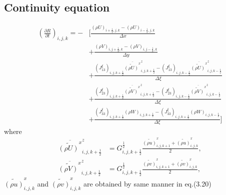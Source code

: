 \subsection{Continuity equation}
\begin{align}
 \left(\frac{\partial R}{\partial t}\right)_{i,j,k}
 = - &\Bigg[ \frac{ (\rho U)_{i+\frac{1}{2},j,k}
                  - (\rho U)_{i-\frac{1}{2},j,k}
                  } {\Delta x} \nonumber \\
          &+ \frac{ (\rho V)_{i,j+\frac{1}{2},k}
                  - (\rho V)_{i,j-\frac{1}{2},k}
                  } {\Delta y} \nonumber \\
          &+ \frac{ (J^{\xi}_{13})_{i,j,k+\frac{1}{2}} \overline{\widetilde{(\rho U)}^x}^z_{i,j,k+\frac{1}{2}}
                  - (J^{\xi}_{13})_{i,j,k-\frac{1}{2}} \overline{\widetilde{(\rho U)}^x}^z_{i,j,k-\frac{1}{2}}
                  } {\Delta \xi} \nonumber \\
          &+ \frac{ (J^{\xi}_{23})_{i,j,k+\frac{1}{2}} \overline{\widetilde{(\rho V)}^x}^z_{i,j,k+\frac{1}{2}}
                  - (J^{\xi}_{23})_{i,j,k-\frac{1}{2}} \overline{\widetilde{(\rho V)}^x}^z_{i,j,k-\frac{1}{2}}
                  } {\Delta \xi} \nonumber \\
          &+ \frac{ (J^{\xi}_{33})_{i,j,k+\frac{1}{2}} (\rho W)_{i,j,k+\frac{1}{2}}
                  - (J^{\xi}_{33})_{i,j,k+\frac{1}{2}} (\rho W)_{i,j,k-\frac{1}{2}}
                  } {\Delta \xi} \Bigg]
\end{align}
where
\begin{align}
 \overline{\widetilde{(\rho U)}^x}^z_{i,j,k+\frac{1}{2}}
 &= G^{\frac{1}{2}}_{i,j,k+\frac{1}{2}} \frac{ \widetilde{(\rho u)}^x_{i,j,k+1}
                                             + \widetilde{(\rho u)}^x_{i,j,k  }
                                             } {2}, \\
 \overline{\widetilde{(\rho V)}^x}^z_{i,j,k+\frac{1}{2}}
 &= G^{\frac{1}{2}}_{i,j,k+\frac{1}{2}} \frac{ \widetilde{(\rho v)}^x_{i,j,k+1}
                                             + \widetilde{(\rho v)}^x_{i,j,k  }
                                             } {2},
\end{align}
$\widetilde{(\rho u)}^x_{i,j,k}$ and $\widetilde{(\rho v)}^x_{i,j,k}$ are obtained by same manner in eq.(3.20)

